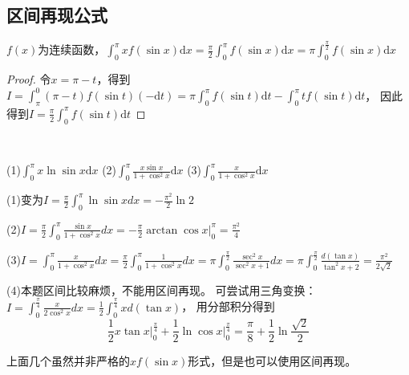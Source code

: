 ~


\subsection{区间再现公式}

\begin{theorem}[区间再现]
  $f(x)$为连续函数，$\int_0^{\pi} x f(\sin x)\mathrm{d}x = \frac{\pi}{2} \int_0^{\pi} f(\sin x)\mathrm{d}x = \pi \int^{\frac{\pi}{2}}_0 f(\sin x)\mathrm{d}x$
\end{theorem}

\begin{proof}
  令$x = \pi - t$，得到$I = \int_{\pi}^0 (\pi - t)f(\sin t)(-\mathrm{d}t) = \pi \int_0^{\pi} f(\sin t)\mathrm{d}t - \int_0^{\pi}t f(\sin t)\mathrm{d}t$，
  因此得到$I = \frac{\pi}{2} \int_0^{\pi} f(\sin t)\mathrm{d}t$
\end{proof}

~

\begin{exercise}[区间再现公式的应用]
  (1)$\int_0^{\pi} x \ln \sin x \mathrm{d}x$
  (2)$\int_0^{\pi} \frac{x \sin x}{1 + \cos^2 x}\mathrm{d}x$
  (3)$\int_0^{\pi}\frac{x}{1 + \cos^2x}\mathrm{d}x$
\end{exercise}

\begin{solution}
  (1)变为$I = \frac{\pi}{2} \int_0^{\pi} \ln \sin x dx = - \frac{\pi^2}{2} \ln 2$

  (2)$I = \frac{\pi}{2} \int_0^{\pi} \frac{\sin x}{1 + \cos^2 x}dx = - \frac{\pi}{2} \arctan \cos x |^{\pi}_0 = \frac{\pi^2}{4}$

  (3)$I = \int_0^{\pi} \frac{x}{1 + \cos^2 x}dx = \frac{\pi}{2} \int_0^{\pi} \frac{1}{1 + \cos^2 x}dx = \pi \int_0^{\frac{\pi}{2}} \frac{\sec^2 x}{\sec^2 x + 1}dx = \pi \int_0^{\frac{\pi}{2}} \frac{d(\tan x)}{\tan^2 x + 2} = \frac{\pi^2}{2 \sqrt{2}}$

  (4)本题区间比较麻烦，不能用区间再现。
  可尝试用三角变换：$I = \int_0^{\frac{\pi}{4}} \frac{x}{2 \cos^2 x}dx = \frac{1}{2} \int_0^{\frac{\pi}{4}}x d(\tan x)$，
  用分部积分得到
  \begin{equation*}
    \frac{1}{2} x \tan x \bigg| _0^{\frac{\pi}{4}} + \frac{1}{2} \ln \cos x \bigg|_0^{\frac{\pi}{4}} = \frac{\pi}{8} + \frac{1}{2} \ln \frac{\sqrt{2}}{2}
  \end{equation*}
\end{solution}

\begin{note}
  上面几个虽然并非严格的$xf(\sin x)$形式，但是也可以使用区间再现。
\end{note}



